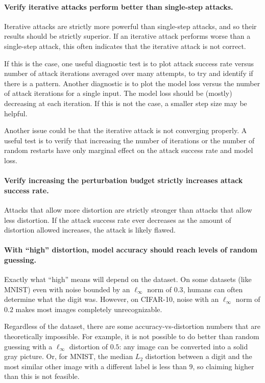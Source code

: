 \documentclass{article} %
\begin{document}
\paragraph{Verify iterative attacks perform better than single-step attacks.}
Iterative attacks are strictly more powerful than single-step
attacks, and so their results should be strictly superior.
%
If an
iterative attack performs worse than a single-step attack, this often
indicates that the iterative attack is not correct.

If this is the case, one useful diagnostic test is to plot attack
success rate versus number of attack iterations averaged over many
attempts, to try and identify if there is a pattern.
%
Another diagnostic is to plot the model loss versus the number of attack
iterations for a single input.
%
The model loss should be (mostly) decreasing at each iteration.
%
If this is not the case, a smaller step size may be helpful.

Another issue could be that the iterative attack is not converging properly.  A useful test is to verify that increasing the number of iterations or the number of random restarts have only marginal effect on the attack success rate and model loss.

\paragraph{Verify increasing the perturbation budget strictly
increases attack success rate.}
\label{sec:monodistortion}
Attacks that allow more distortion are strictly stronger
than attacks that allow less distortion.
%
If the attack success rate
ever decreases as the amount of distortion allowed increases, the
attack is likely flawed.

\paragraph{With ``high'' distortion, model accuracy should reach
  levels of random guessing.}
%
Exactly what ``high'' means will depend on the dataset.
%
On some datasets (like MNIST) even with noise bounded by an
$\ell_\infty$ norm of $0.3$, humans can often determine what
the digit was.
%
However, on CIFAR-10, noise with an $\ell_\infty$ norm of $0.2$ makes most
images completely unrecognizable.

Regardless of the dataset, there are some accuracy-vs-distortion
numbers that are theoretically impossible.
%
For example, it is not
possible to do better than random guessing with a $\ell_\infty$
distortion of $0.5$: any image can be converted into a solid gray
picture.
%
Or, for MNIST, the median $L_2$ distortion between a
digit and the most similar other image with a different label
is less than $9$, so claiming higher than this is not feasible.
\end{document}
